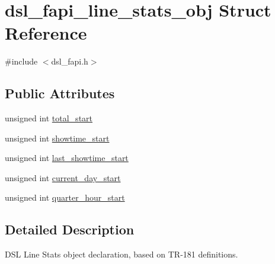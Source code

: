\hypertarget{structdsl__fapi__line__stats__obj}{\section{dsl\-\_\-fapi\-\_\-line\-\_\-stats\-\_\-obj Struct Reference}
\label{structdsl__fapi__line__stats__obj}
}


{\ttfamily \#include $<$dsl\-\_\-fapi.\-h$>$}

\subsection*{Public Attributes}
\begin{DoxyCompactItemize}
\item 
unsigned int \hyperlink{structdsl__fapi__line__stats__obj_abf7d09535ce7e6ac6b380bdb52b10558}{total\-\_\-start}
\item 
unsigned int \hyperlink{structdsl__fapi__line__stats__obj_a92c60819d5677949b2e35c3a81dbf3a5}{showtime\-\_\-start}
\item 
unsigned int \hyperlink{structdsl__fapi__line__stats__obj_a4716069edab0bee87955a7db1836f951}{last\-\_\-showtime\-\_\-start}
\item 
unsigned int \hyperlink{structdsl__fapi__line__stats__obj_a49cd48f81418660fca1de5040e0c92b3}{current\-\_\-day\-\_\-start}
\item 
unsigned int \hyperlink{structdsl__fapi__line__stats__obj_af8e8fdd806dfee26ef66bad4c127003f}{quarter\-\_\-hour\-\_\-start}
\end{DoxyCompactItemize}


\subsection{Detailed Description}
D\-S\-L Line Stats object declaration, based on T\-R-\/181 definitions. 

